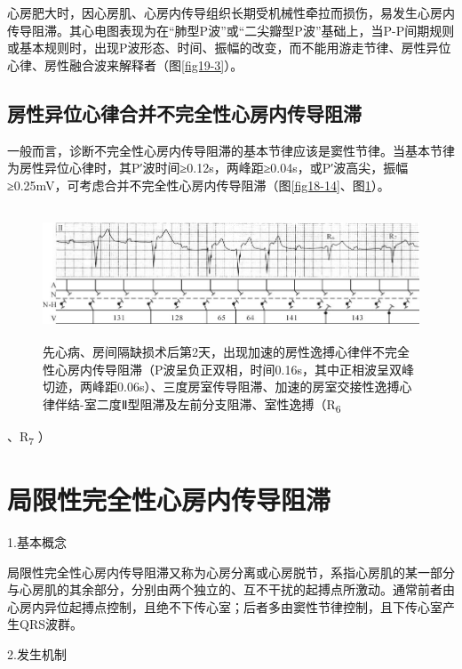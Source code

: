 心房肥大时，因心房肌、心房内传导组织长期受机械性牵拉而损伤，易发生心房内传导阻滞。其心电图表现为在“肺型P波”或“二尖瓣型P波”基础上，当P-P间期规则或基本规则时，出现P波形态、时间、振幅的改变，而不能用游走节律、房性异位心律、房性融合波来解释者（图\ref{fig19-3}）。

\protect\hypertarget{text00026.htmlux5cux23subid320}{}{}

\subsection{房性异位心律合并不完全性心房内传导阻滞}

一般而言，诊断不完全性心房内传导阻滞的基本节律应该是窦性节律。当基本节律为房性异位心律时，其P′波时间≥0.12s，两峰距≥0.04s，或P′波高尖，振幅≥0.25mV，可考虑合并不完全性心房内传导阻滞（图\ref{fig18-14}、图\ref{fig19-10}）。

\begin{figure}[!htbp]
 \centering
 \includegraphics[width=5.80208in,height=1.55208in]{./images/Image00326.jpg}
 \captionsetup{justification=centering}
 \caption{先心病、房间隔缺损术后第2天，出现加速的房性逸搏心律伴不完全性心房内传导阻滞（P波呈负正双相，时间0.16s，其中正相波呈双峰切迹，两峰距0.06s）、三度房室传导阻滞、加速的房室交接性逸搏心律伴结-室二度Ⅱ型阻滞及左前分支阻滞、室性逸搏（R\textsubscript{6}}
 \label{fig19-10}
  \end{figure} 
、R\textsubscript{7} ）

\protect\hypertarget{text00026.htmlux5cux23subid321}{}{}

\section{局限性完全性心房内传导阻滞}

1.基本概念

局限性完全性心房内传导阻滞又称为心房分离或心房脱节，系指心房肌的某一部分与心房肌的其余部分，分别由两个独立的、互不干扰的起搏点所激动。通常前者由心房内异位起搏点控制，且绝不下传心室；后者多由窦性节律控制，且下传心室产生QRS波群。

2.发生机制

